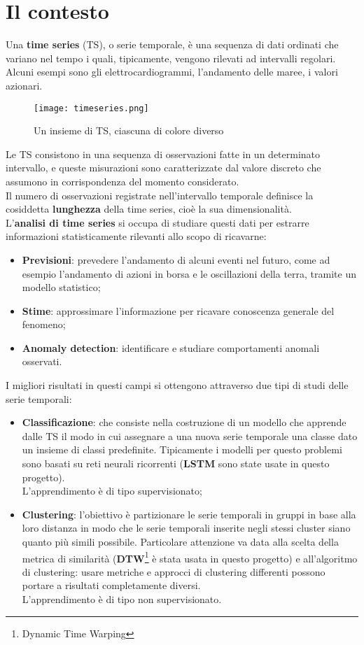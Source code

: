 \section{Il contesto}
Una \textbf{time series} (TS), o serie temporale, è una sequenza di dati ordinati che variano nel tempo i quali, tipicamente, vengono rilevati ad intervalli regolari. Alcuni esempi sono gli elettrocardiogrammi, l'andamento delle maree, i valori azionari.
\begin{figure}[H]
	\centering
	\texttt{[image: timeseries.png]}
	\caption{Un insieme di TS, ciascuna di colore diverso}
	\label{fig:timeseries}
\end{figure}
Le TS consistono in una sequenza di osservazioni fatte in un determinato intervallo, e queste misurazioni sono caratterizzate dal valore discreto che assumono in corrispondenza del momento considerato.\\
Il numero di osservazioni registrate nell'intervallo temporale definisce la cosiddetta \textbf{lunghezza} della time series, cioè la sua dimensionalità.
\\
L'\textbf{analisi di time series} si occupa di studiare questi dati per estrarre informazioni statisticamente rilevanti allo scopo di ricavarne:
\begin{itemize}
	\item \textbf{Previsioni}: prevedere l'andamento di alcuni eventi nel futuro, come ad esempio l'andamento di azioni in borsa e le oscillazioni della terra, tramite un modello statistico;
	\item \textbf{Stime}: approssimare l'informazione per ricavare conoscenza generale del fenomeno;
	\item \textbf{Anomaly detection}: identificare e studiare comportamenti anomali osservati.
\end{itemize}
I migliori risultati in questi campi si ottengono attraverso due tipi di studi delle serie temporali:
\begin{itemize}
	\item \textbf{Classificazione}: che consiste nella costruzione di un modello che apprende dalle TS il modo in cui assegnare a una nuova serie temporale una classe dato un insieme di classi predefinite. Tipicamente i modelli per questo problemi sono basati su reti neurali ricorrenti (\textbf{LSTM} sono state usate in questo progetto). 
	\\L'apprendimento è di tipo supervisionato;
	\item \textbf{Clustering}: l'obiettivo è partizionare le serie temporali in gruppi in base alla loro distanza in modo che le serie temporali inserite negli stessi cluster siano quanto più simili possibile. Particolare attenzione va data alla scelta della metrica di similarità (\textbf{DTW}\footnote{Dynamic Time Warping} è stata usata in questo progetto) e all'algoritmo di clustering: usare metriche e approcci di clustering differenti possono portare a risultati completamente diversi. 
	\\L'apprendimento è di tipo non supervisionato.
\end{itemize}

